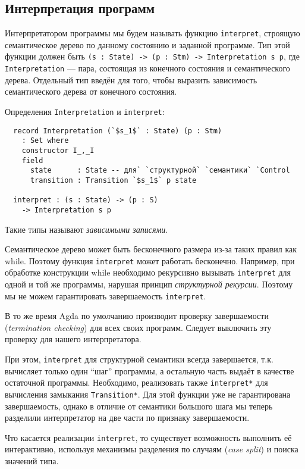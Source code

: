 \documentclass[aps,12pt,final,oneside,onecolumn,musixtex,superscriptaddress,centertags]{article}
\newcommand{\lcode}[1]{\lstinline[basicstyle=\ttfamily\normalsize]{#1}}
\begin{document}
  \subsection{Интерпретация программ}

  Интерпретатором программы мы будем называть функцию \lcode{interpret}, строящую семантическое дерево по данному состоянию и заданной программе. Тип этой функции должен быть \lcode{(s : State) -> (p : Stm) -> Interpretation s p}, где \lcode{Interpretation} --- пара, состоящая из конечного состояния и семантического дерева. Отдельный тип введён для того, чтобы выразить зависимость семантического дерева от конечного состояния.

  Определения \lcode{Interpretation} и \lcode{interpret}:
  \begin{lstlisting}
  record Interpretation (`$s_1$` : State) (p : Stm)
    : Set where
    constructor I_,_I
    field
      state      : State -- для` `структурной` `семантики` `Control
      transition : Transition `$s_1$` p state

  interpret : (s : State) -> (p : S)
    -> Interpretation s p
  \end{lstlisting}
  
  Такие типы называют \emph{зависимыми записями}.

  Семантическое дерево может быть бесконечного размера из-за таких правил как while. Поэтому функция \lcode{interpret} может работать бесконечно. Например, при обработке конструкции while необходимо рекурсивно вызывать \lcode{interpret} для одной и той же программы, нарушая принцип \emph{структурной рекурсии}. Поэтому мы не можем гарантировать завершаемость \lcode{interpret}.

  В то же время Agda по умолчанию производит проверку завершаемости (\emph{termination checking}) для всех своих программ. Следует выключить эту проверку для нашего интерпретатора.

  При этом, \lcode{interpret} для структурной семантики всегда завершается, т.к. вычисляет только один ``шаг'' программы, а остальную часть выдаёт в качестве остаточной программы. Необходимо, реализовать также \lcode{interpret*} для вычисления замыкания \lcode{Transition*}. Для этой функции уже не гарантирована завершаемость, однако в отличие от семантики большого шага мы теперь разделили интерпретатор на две части по признаку завершаемости.

  Что касается реализации \lcode{interpret}, то существует возможность выполнить её интерактивно, используя механизмы разделения по случаям (\emph{case split}) и поиска значений типа.
\end{document}
